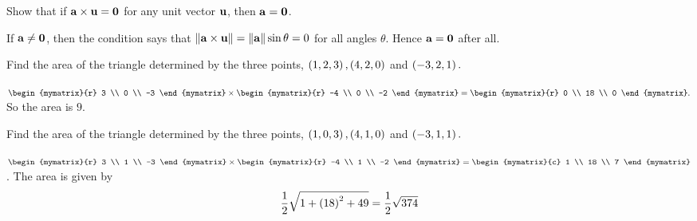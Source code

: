 \begin{enumialphparenastyle}

\begin{ex} Show that if ${\bf a}\times {\bf u}={\bf 0}$ for any unit vector ${\bf u}
$, then ${\bf a}={\bf 0}$.
\begin{sol}
If ${\bf a}\neq {\bf 0}$, then the condition says that $\|{\bf a}\times {\bf u}\| = \|{\bf a}\| \sin \theta =0$ for all angles $\theta $. Hence ${\bf a} = {\bf 0}$ after all.
\end{sol}
\end{ex}

\begin{ex} Find the area of the triangle determined by the three points, $\left(
1,2,3\right) ,\left(4,2,0\right) $ and $\left(-3,2,1\right) .$
\begin{sol}
$\begin{mymatrix}{r}
3 \\
0 \\
-3
\end{mymatrix} \times \begin{mymatrix}{r}
 -4 \\
0 \\
-2
\end{mymatrix} =\begin{mymatrix}{r}
0 \\
18 \\
0
\end{mymatrix} .$ So the area is $9.$
\end{sol}
\end{ex}

\begin{ex} Find the area of the triangle determined by the three points, $\left(
1,0,3\right) ,\left(4,1,0\right) $ and $\left(-3,1,1\right) .$
\begin{sol}
 $\begin{mymatrix}{r}
3 \\
1 \\
-3
\end{mymatrix} \times \begin{mymatrix}{r}
 -4 \\
1 \\
-2
\end{mymatrix} =\begin{mymatrix}{c}
1 \\
18 \\
7
\end{mymatrix}$. The area is given by 
\[
\frac{1}{2}\sqrt{1+\left(18\right) ^{2}+49}=\frac{1}{2}\sqrt{374}
\]
\end{sol}
\end{ex}


\end{enumialphparenastyle}
